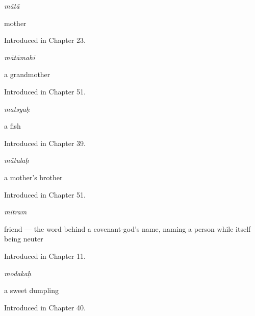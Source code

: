 \noindent\begin{minipage}[t]{\linewidth}
\raggedright
\textbf{}\enspace\emph{mātā}\par
\small mother\par
\footnotesize Introduced in Chapter 23.
\end{minipage}\par\medskip

\noindent\begin{minipage}[t]{\linewidth}
\raggedright
\textbf{}\enspace\emph{mātāmahī}\par
\small a grandmother\par
\footnotesize Introduced in Chapter 51.
\end{minipage}\par\medskip

\noindent\begin{minipage}[t]{\linewidth}
\raggedright
\textbf{}\enspace\emph{matsyaḥ}\par
\small a fish\par
\footnotesize Introduced in Chapter 39.
\end{minipage}\par\medskip

\noindent\begin{minipage}[t]{\linewidth}
\raggedright
\textbf{}\enspace\emph{mātulaḥ}\par
\small a mother's brother\par
\footnotesize Introduced in Chapter 51.
\end{minipage}\par\medskip

\noindent\begin{minipage}[t]{\linewidth}
\raggedright
\textbf{}\enspace\emph{mitram}\par
\small friend — the word behind a covenant-god's name, naming a person while itself being neuter\par
\footnotesize Introduced in Chapter 11.
\end{minipage}\par\medskip

\noindent\begin{minipage}[t]{\linewidth}
\raggedright
\textbf{}\enspace\emph{modakaḥ}\par
\small a sweet dumpling\par
\footnotesize Introduced in Chapter 40.
\end{minipage}\par\medskip

